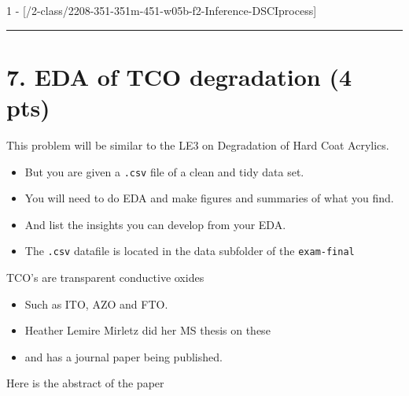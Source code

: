 \documentclass[
]{article}
\providecommand{\tightlist}{%
  \setlength{\itemsep}{0pt}\setlength{\parskip}{0pt}}
\begin{document}
1 - {[}/2-class/2208-351-351m-451-w05b-f2-Inference-DSCIprocess{]}

\begin{center}\rule{0.5\linewidth}{0.5pt}\end{center}

\hypertarget{eda-of-tco-degradation-4-pts}{%
\section{7. EDA of TCO degradation (4
pts)}\label{eda-of-tco-degradation-4-pts}}

This problem will be similar to the LE3 on Degradation of Hard Coat
Acrylics.

\begin{itemize}
\tightlist
\item
  But you are given a \texttt{.csv} file of a clean and tidy data set.
\item
  You will need to do EDA and make figures and summaries of what you
  find.
\item
  And list the insights you can develop from your EDA.
\item
  The \texttt{.csv} datafile is located in the data subfolder of the
  \texttt{exam-final}
\end{itemize}

TCO's are transparent conductive oxides

\begin{itemize}
\tightlist
\item
  Such as ITO, AZO and FTO.
\item
  Heather Lemire Mirletz did her MS thesis on these
\item
  and has a journal paper being published.
\end{itemize}

Here is the abstract of the paper
\end{document}
